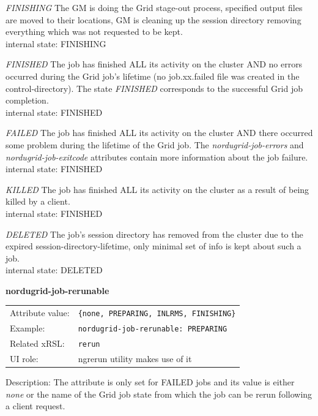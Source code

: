 \documentclass{article}
\begin{document}
{\it FINISHING}
The GM is doing the Grid stage-out process, specified output files
are moved to their locations, GM is cleaning up the session directory removing
everything which was not requested to be kept. \\
internal state: FINISHING


{\it FINISHED}
The job has finished ALL its activity on the cluster
AND no errors occurred during the Grid job's lifetime (no job.xx.failed file was 
created in the control-directory).
The state {\it FINISHED} corresponds to the successful Grid job completion. \\
internal state: FINISHED


{\it FAILED}
The job has finished ALL its activity on the cluster AND there occurred some problem during 
the lifetime of the Grid job. The {\it nordugrid-job-errors} and 
{\it nordugrid-job-exitcode} attributes contain more information about the job failure. \\
internal state: FINISHED


{\it KILLED}
The job has finished ALL its activity on the cluster as a result of being killed by
a client. \\
internal state: FINISHED


{\it DELETED}
The job's session directory has removed from the cluster due to the
expired session-directory-lifetime, only minimal set of info is kept about such a job. \\
internal state: DELETED


  \hspace*{0.5cm}
  \begin{shaded}
    \textbf{nordugrid-job-rerunable}
  \end{shaded}
  \begin{tabular}{lp{10cm}}  
    Attribute value:& \verb#{none, PREPARING, INLRMS, FINISHING}#\\
    Example:& \verb#nordugrid-job-rerunable: PREPARING#\\   
    Related xRSL:& \verb#rerun#\\
    UI role:& ngrerun utility makes use of it\\
  \end{tabular}

Description: The attribute is only set for FAILED jobs and its value is either 
{\it none} or the name of the Grid job state from which the job can be rerun
following a client request.
\end{document}

